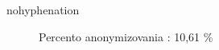 \begin{hyphenrules}{nohyphenation}
\begin{figure}[H]
\begin{minipage}[t]{.5\linewidth}
\caption{Percento anonymizovania : 10,61 \%}
\label{fig:5.1} 
\end{minipage}\hfill
\begin{minipage}[b]{.5\linewidth}

\end{minipage}
\end{figure}
\end{hyphenrules}
